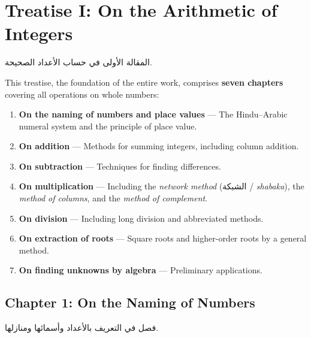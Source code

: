 \documentclass[11pt,a4paper]{article}
\newenvironment{arabicbox}{%
  \begin{framed}
  \begin{minipage}{\linewidth-2\fboxsep-2\fboxrule}
  \setlength{\parindent}{0pt}
  \linespread{1.3}\selectfont
}{%
  \end{minipage}
  \end{framed}
}
\newcommand{\ar}[1]{{\arabicfont\beginR #1\endR}}
\begin{document}
\section{Treatise I: On the Arithmetic of Integers}
\label{sec:treatise1}

\begin{arabicbox}
\begin{Arabic}
المقالة الأولى في حساب الأعداد الصحيحة.
\end{Arabic}
\end{arabicbox}

\vspace{0.3cm}

\noindent This treatise, the foundation of the entire work, comprises
\textbf{seven chapters} covering all operations on whole numbers:

\begin{enumerate}[label=\textbf{Ch.\arabic*:}]
  \item \textbf{On the naming of numbers and place values} --- The
  Hindu--Arabic numeral system and the principle of place value.
  \item \textbf{On addition} --- Methods for summing integers, including
  column addition.
  \item \textbf{On subtraction} --- Techniques for finding differences.
  \item \textbf{On multiplication} --- Including the \textit{network
  method} (\ar{الشبكة} / \textit{shabaka}), the \textit{method of
columns}, and the \textit{method of complement}.
  \item \textbf{On division} --- Including long division and abbreviated
  methods.
  \item \textbf{On extraction of roots} --- Square roots and higher-order
  roots by a general method.
  \item \textbf{On finding unknowns by algebra} --- Preliminary
  applications.
\end{enumerate}

\subsection{Chapter 1: On the Naming of Numbers}

\begin{arabicbox}
\begin{Arabic}
فصل في التعريف بالأعداد وأسمائها ومنازلها.
\end{Arabic}
\end{arabicbox}
\end{document}
